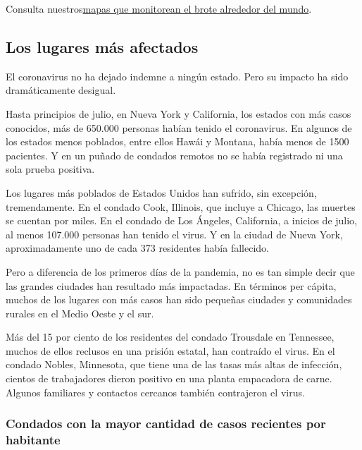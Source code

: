 Consulta
nuestros\href{https://www.nytimes3xbfgragh.onion/interactive/2020/world/coronavirus-maps.html}{mapas
que monitorean el brote alrededor del mundo}.

\hypertarget{los-lugares-muxe1s-afectados}{%
\subsection{Los lugares más
afectados}\label{los-lugares-muxe1s-afectados}}

El coronavirus no ha dejado indemne a ningún estado. Pero su impacto ha
sido dramáticamente desigual.

Hasta principios de julio, en Nueva York y California, los estados con
más casos conocidos, más de 650.000 personas habían tenido el
coronavirus. En algunos de los estados menos poblados, entre ellos Hawái
y Montana, había menos de 1500 pacientes. Y en un puñado de condados
remotos no se había registrado ni una sola prueba positiva.

Los lugares más poblados de Estados Unidos han sufrido, sin excepción,
tremendamente. En el condado Cook, Illinois, que incluye a Chicago, las
muertes se cuentan por miles. En el condado de Los Ángeles, California,
a inicios de julio, al menos 107.000 personas han tenido el virus. Y en
la ciudad de Nueva York, aproximadamente uno de cada 373 residentes
había fallecido.

Pero a diferencia de los primeros días de la pandemia, no es tan simple
decir que las grandes ciudades han resultado más impactadas. En términos
per cápita, muchos de los lugares con más casos han sido pequeñas
ciudades y comunidades rurales en el Medio Oeste y el sur.

Más del 15 por ciento de los residentes del condado Trousdale en
Tennessee, muchos de ellos reclusos en una prisión estatal, han
contraído el virus. En el condado Nobles, Minnesota, que tiene una de
las tasas más altas de infección, cientos de trabajadores dieron
positivo en una planta empacadora de carne. Algunos familiares y
contactos cercanos también contrajeron el virus.

\hypertarget{condados-con-la-mayor-cantidad-de-casos-recientes-por-habitante}{%
\subsubsection{Condados con la mayor cantidad de casos recientes por
habitante}\label{condados-con-la-mayor-cantidad-de-casos-recientes-por-habitante}}

